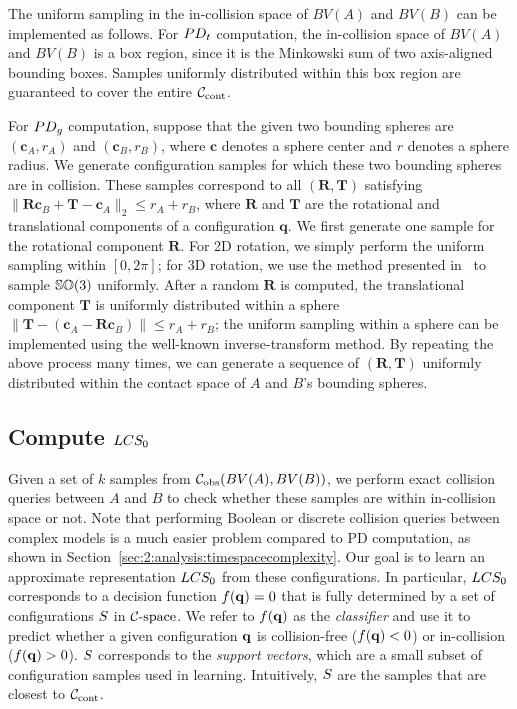 The uniform sampling in the in-collision space of $BV(A)$ and $BV(B)$ can be implemented as follows. 
For $PD_t$ computation, the in-collision space of $BV(A)$ and $BV(B)$ is a box region, since it is the Minkowski sum of two axis-aligned bounding boxes. Samples uniformly distributed within this box region are guaranteed to cover the entire $\mathcal C_\text{cont}$.

For $PD_g$ computation, suppose that the given two bounding spheres are $(\mathbf c_A, r_A)$ and
$(\mathbf c_B, r_B)$, where $\mathbf c$ denotes a sphere center and $r$ denotes a sphere radius. We generate configuration samples for which these two bounding spheres are in collision. These samples correspond to all $(\mathbf R, \mathbf T)$ satisfying $\|\mathbf R \mathbf c_B + \mathbf T - \mathbf c_A\|_2 \leq r_A + r_B$, where $\mathbf R$ and $\mathbf T$ are the rotational and translational components of a configuration $\mathbf q$. We first generate one sample for the rotational component $\mathbf R$. For 2D rotation, we simply perform the uniform sampling within $[0, 2\pi]$; for 3D rotation, we use the method presented in~\cite{Shoemake:1992:URR} to sample $\mathbb {SO}(3)$ uniformly. After a random $\mathbf R$ is computed, the translational component $\mathbf T$ is uniformly distributed within a sphere $\|\mathbf T - (\mathbf c_A - \mathbf R \mathbf c_B)\| \leq r_A + r_B$; the uniform sampling within a sphere can be implemented using the well-known inverse-transform method. By repeating the above process many times, we can generate a sequence of $(\mathbf R, \mathbf T)$ uniformly distributed within the contact space of $A$ and $B$'s bounding spheres.

\subsection{Compute $LCS_0$} \label{sec:2:offline:model}
Given a set of $k$ samples from
$\mathcal C_{\text{obs}}(BV(A),BV(B))$, we perform exact collision queries between $A$ and $B$ to
check whether these samples are within in-collision space or not. Note that performing Boolean or discrete collision queries between complex models is a much easier problem compared to PD computation, as shown in Section~\ref{sec:2:analysis:timespacecomplexity}.
Our goal is to learn an approximate representation $LCS_0$ from these
configurations. In particular, $LCS_0$ corresponds to a decision function
$f(\mathbf q)=0$ that is fully determined by a set of configurations $S$
in $\mathcal C\text{-space}$. We refer to $f(\mathbf q)$ as the \emph{classifier} and use it to
predict whether a given configuration $\mathbf q$ is collision-free
($f(\mathbf q)<0$) or in-collision ($f(\mathbf q)>0$). $S$ corresponds to the \emph{support vectors}, which are a
small subset of configuration samples used in learning.
Intuitively, $S$ are the samples that are closest to $\mathcal C_\text{cont}$.

